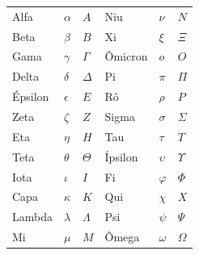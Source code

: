 \documentclass[../../../include/open-logic-chapter]{subfiles}
\begin{document}

\begin{center}
    \begin{tabular}{lll@{\qquad}lll}
    Alfa &	$\alpha$ & $A$ &
    Niu & $\nu$ & $N$ \\
    Beta & $\beta$ & $B$ &
    Xi & $\xi$ & $\Xi$ \\
    Gama &	$\gamma$ & $\Gamma$ &
    Ômicron & $o$ & $O$ \\
    Delta & $\delta$ & $\Delta$ &
    Pi & $\pi$ & $\Pi$ \\
    Épsilon & $\epsilon$ & $E$ &
    Rô & $\rho$ & $P$ \\
    Zeta & $\zeta$ & $Z$ &
    Sigma &	$\sigma$ & $\Sigma$ \\
    Eta & $\eta$ & $H$ &
    Tau & $\tau$ & $T$ \\
    Teta & $\theta$ & $\Theta$ &
    Ípsilon & $\upsilon$ & $\Upsilon$ \\
    Iota & $\iota$ & $I$ &
    Fi & $\varphi$ & $\Phi$ \\
    Capa & $\kappa$ & $K$ &
    Qui & $\chi$ & $X$ \\
    Lambda & $\lambda$ & $\Lambda$ &
    Psi & $\psi$ & $\Psi$ \\
    Mi & $\mu$ & $M$ &
    Ômega & $\omega$ & $\Omega$
    \end{tabular}
\end{center}
\end{document}
